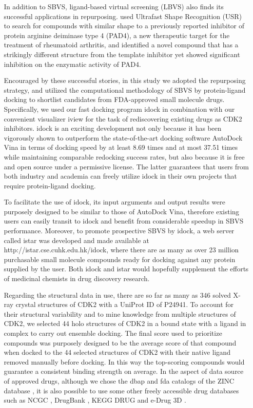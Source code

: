 \documentclass[10pt]{article}
\begin{document}
In addition to SBVS, ligand-based virtual screening (LBVS) also finds its successful applications in repurposing. \cite{1504} used Ultrafast Shape Recognition (USR) \cite{1379} to search for compounds with similar shape to a previously reported inhibitor of protein arginine deiminase type 4 (PAD4), a new therapeutic target for the treatment of rheumatoid arthritis, and identified a novel compound that has a strikingly different structure from the template inhibitor yet showed significant inhibition on the enzymatic activity of PAD4.

Encouraged by these successful stories, in this study we adopted the repurposing strategy, and utilized the computational methodology of SBVS by protein-ligand docking to shortlist candidates from FDA-approved small molecule drugs. Specifically, we used our fast docking program idock \cite{1153,1362} in combination with our convenient visualizer iview \cite{1366} for the task of rediscovering existing drugs as CDK2 inhibitors. idock is an exciting development not only because it has been vigorously shown \cite{1362} to outperform the state-of-the-art docking software AutoDock Vina \cite{595} in terms of docking speed by at least 8.69 times and at most 37.51 times while maintaining comparable redocking success rates, but also because it is free and open source under a permissive license. The latter guarantees that users from both industry and academia can freely utilize idock in their own projects that require protein-ligand docking.

To facilitate the use of idock, its input arguments and output results were purposely designed to be similar to those of AutoDock Vina, therefore existing users can easily transit to idock and benefit from considerable speedup in SBVS performance. Moreover, to promote prospective SBVS by idock, a web server called istar \cite{1362} was developed and made available at http://istar.cse.cuhk.edu.hk/idock, where there are as many as over 23 million purchasable small molecule compounds ready for docking against any protein supplied by the user. Both idock \cite{1153} and istar \cite{1362} would hopefully supplement the efforts of medicinal chemists in drug discovery research.

Regarding the structural data in use, there are so far as many as 346 solved X-ray crystal structures of CDK2 with a UniProt ID of P24941. To account for their structural variability and to mine knowledge from multiple structures of CDK2, we selected 44 holo structures of CDK2 in a bound state with a ligand in complex to carry out ensemble docking. The final score used to prioritize compounds was purposely designed to be the average score of that compound when docked to the 44 selected structures of CDK2 with their native ligand removed manually before docking. In this way the top-scoring compounds would guarantee a consistent binding strength on average. In the aspect of data source of approved drugs, although we chose the dbap and fda catalogs of the ZINC database \cite{532,1178}, it is also possible to use some other freely accessible drug databases such as NCGC \cite{1608}, DrugBank \cite{1594}, KEGG DRUG \cite{1595} and e-Drug 3D \cite{1125}.
\end{document}
